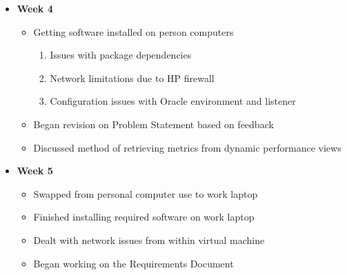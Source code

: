 \documentclass[xcolor=dvipsnames]{beamer}
\begin{document}
\begin{frame}
\begin{itemize}
	\item \textbf{Week 4}
    \begin{itemize}
    	\item Getting software installed on person computers
        \begin{enumerate}
        	\item Issues with package dependencies
            \item Network limitations due to HP firewall
            \item Configuration issues with Oracle environment and listener
        \end{enumerate}
        \item Began revision on Problem Statement based on feedback
        \item Discussed method of retrieving metrics from dynamic performance views
	\end{itemize}
\end{itemize}
\end{frame}

\begin{frame}
\begin{itemize}
	\item \textbf{Week 5}
    \begin{itemize}
    	\item Swapped from personal computer use to work laptop
        \item Finished installing required software on work laptop
        \item Dealt with network issues from within virtual machine
        \item Began working on the Requirements Document
	\end{itemize}
\end{itemize}
\end{frame}
\end{document}
